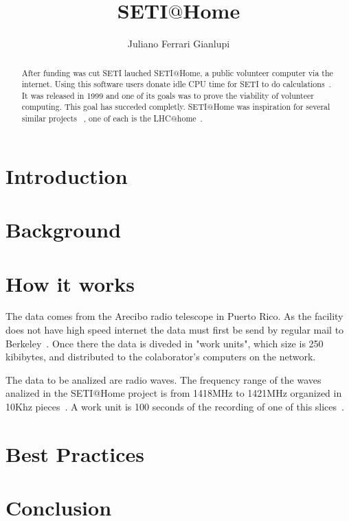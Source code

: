 \title{SETI$@$Home}

\author{Juliano Ferrari Gianlupi}


\renewcommand{\shortauthors}{J. F. Gianlupi}


\begin{abstract}
After funding was cut SETI lauched SETI$@$Home, a public volunteer computer 
via the internet. Using this software users donate idle CPU time for SETI to do 
calculations~\cite{hid-sp18-601-www-sathome-about}. It was released in 1999 and 
one of its goals was to prove the viability of volunteer computing. This goal 
has succeded completly. SETI$@$Home was inspiration for several similar projects
 ~\cite{hid-sp18-601-www-boinc-projects}, one of each is the 
 LHC$@$home~\cite{hid-sp18-601-www-lhc-at-home-history}.
\end{abstract}



\maketitle

\section{Introduction}

\section{Background}

\section{How it works}

The data comes from the Arecibo radio telescope in Puerto Rico. As the facility
does not have high speed internet the data must first be send by regular mail to
 Berkeley~\cite{hid-sp18-601-www-sathome-howworks}. Once there the data is 
 diveded in "work units", which size is 250 kibibytes, and distributed to the 
 colaborator's computers on the network.

The data to be analized are radio waves. The frequency range of the waves 
analized in the SETI$@$Home project is from 1418MHz to 1421MHz organized in 
10Khz pieces~\cite{hid-sp18-601-paper-anderson2002seti}. A work unit is 100 
seconds of the recording of one of this 
slices~\cite{hid-sp18-601-www-sathome-howworks}.
 

\section{Best Practices}


\section{Conclusion}

\begin{acks}

\end{acks}


 

